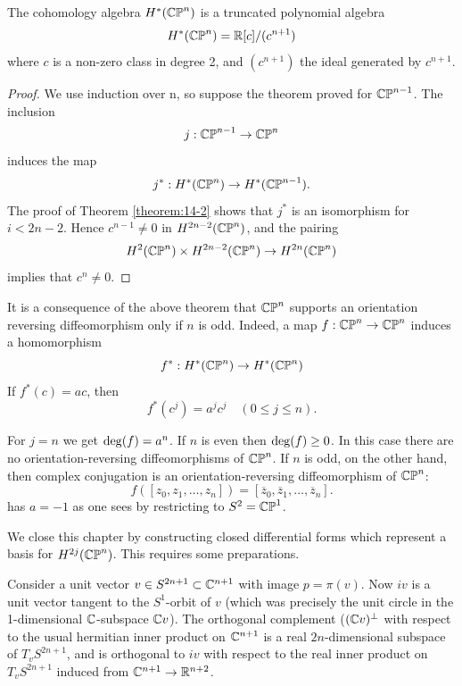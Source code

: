 \begin{theorem}\label{theorem:14-3}
  The cohomology algebra $H^*(\mathbb{CP}^n)$ is a truncated polynomial algebra
  \[
    H^*(\mathbb{CP}^n) ={\mathbb{R}}[c]/(c^{n+1})
  \]
  where $c$ is a non-zero class in degree 2, and $(c^{n+1})$ the ideal generated by $c^{n+1}$.
\end{theorem}

\begin{proof}
  We use induction over n, so suppose the theorem proved for $\mathbb{CP}^{n-1}$. The inclusion
  \[
    j:\mathbb{CP}^{n-1}\to\mathbb{CP}^n
  \]
  induces the map 
  \[
    j^*:H^*(\mathbb{CP}^n)\to H^*(\mathbb{CP}^{n-1}).
  \]
  The proof of Theorem \ref{theorem:14-2} shows that $j^*$ is an isomorphism for $i < 2n -2$.
  Hence $c^{n-1}\neq 0$ in $H^{2n- 2}(\mathbb{CP}^n)$, and the pairing
  \[
    H^2(\mathbb{CP}^n)\times H^{2n-2}(\mathbb{CP}^n)\to H^{2n}(\mathbb{CP}^n)
  \]
  implies that $c^n\neq 0$.
\end{proof}

It is a consequence of the above theorem that $\mathbb{CP}^n$ supports an orientation reversing 
diffeomorphism only if $n$ is odd. Indeed, a map $f:\mathbb{CP}^n\to\mathbb{CP}^n$ induces a homomorphism
\[
  f^*:H^*(\mathbb{CP}^n)\to H^*(\mathbb{CP}^n)
\]
If $f^*(c)=ac$, then 
\[
  f^*(c^j) = a^jc^j\quad (0\le j\le n).
\]

For $j = n$ we get $\mathrm{deg}(f) = a^n$. If $n$ is even then $\mathrm{deg}(f)\ge 0$. In this case there are
no orientation-reversing diffeomorphisms of $\mathbb{CP}^n$. If $n$ is odd, on the other hand,
then complex conjugation is an orientation-reversing diffeomorphism of $\mathbb{CP}^n$:
\[
  f([z_0, z_1, \ldots, z_n]) = [\overline{z}_0, \overline{z}_1, \ldots, \overline{z}_n].
\]
has $a=-1$ as one sees by restricting to $S^2=\mathbb{CP}^1$.

We close this chapter by constructing closed differential forms which represent a
basis for $H^{2j}(\mathbb{CP}^n)$. This requires some preparations.

Consider a unit vector $v\in S^{2n+1}\subset{\ensuremath{\mathbb{C}}}^{n+1}$ with image $p = \pi(v)$. Now $iv$ is a
unit vector tangent to the $S^1$-orbit of $v$ (which was precisely the unit circle in the
1-dimensional ${\mathbb{C}}$-subspace ${\mathbb{C}} v$). The orthogonal complement ($({\mathbb{C}} v)^{\perp}$ with respect
to the usual hermitian inner product on ${\mathbb{C}}^{n+1}$ is a real $2n$-dimensional subspace
of $T_v S^{2n+1}$, and is orthogonal to $iv$ with respect to the real inner product on
$T_v S^{2n+1}$ induced from ${\mathbb{C}}^{n+1}\to{\ensuremath{\mathbb{R}}}^{n+2}$.


